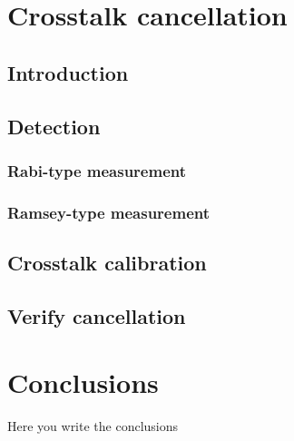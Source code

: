 \documentclass[12pt,a4paper]{report}
\begin{document}





\begingroup
    \hypersetup{linkcolor=black}
    \renewcommand\contentsname{\bfseries Contents}
    \tableofcontents
\endgroup





\chapter{Crosstalk cancellation}
\section{Introduction}
\section{Detection}
\subsection{Rabi-type measurement}
\subsection{Ramsey-type measurement}
\section{Crosstalk calibration}
\section{Verify cancellation}




\chapter*{Conclusions}
\label{chap:conclusions}

Here you write the conclusions



\printbibliography[heading=bibintoc]

\thispagestyle{plain}
\end{document}
